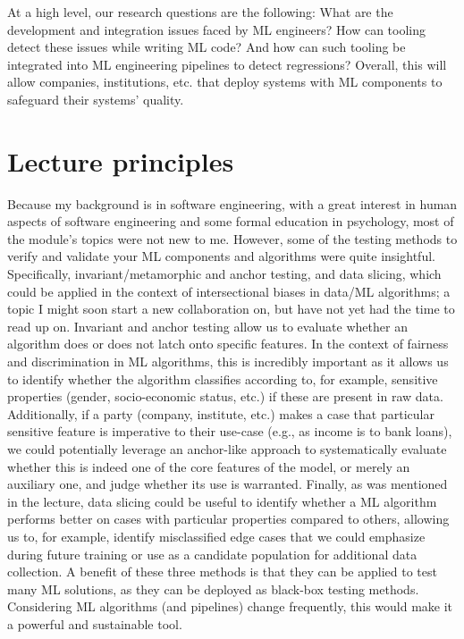     At a high level, our research questions are the following: What are the development and integration issues faced by ML engineers? How can tooling detect these issues while writing ML code? And how can such tooling be integrated into ML engineering pipelines to detect regressions?
    Overall, this will allow companies, institutions, etc. that deploy systems with ML components to safeguard their systems' quality.


\section*{Lecture principles}


    Because my background is in software engineering, with a great interest in human aspects of software engineering and some formal education in psychology, most of the module's topics were not new to me.
    However, some of the testing methods to verify and validate your ML components and algorithms were quite insightful.
    Specifically, invariant/metamorphic and anchor testing, and data slicing, which could be applied in the context of intersectional biases in data/ML algorithms; a topic I might soon start a new collaboration on, but have not yet had the time to read up on.
    Invariant and anchor testing allow us to evaluate whether an algorithm does or does not latch onto specific features.
    In the context of fairness and discrimination in ML algorithms, this is incredibly important as it allows us to identify whether the algorithm classifies according to, for example, sensitive properties (gender, socio-economic status, etc.) if these are present in raw data.
    Additionally, if a party (company, institute, etc.) makes a case that particular sensitive feature is imperative to their use-case (e.g., as income is to bank loans), we could potentially leverage an anchor-like approach to systematically evaluate whether this is indeed one of the core features of the model, or merely an auxiliary one, and judge whether its use is warranted.
    Finally, as was mentioned in the lecture, data slicing could be useful to identify whether a ML algorithm performs better on cases with particular properties compared to others, allowing us to, for example, identify misclassified edge cases that we could emphasize during future training or use as a candidate population for additional data collection.
    A benefit of these three methods is that they can be applied to test many ML solutions, as they can be deployed as black-box testing methods.
    Considering ML algorithms (and pipelines) change frequently, this would make it a powerful and sustainable tool.


